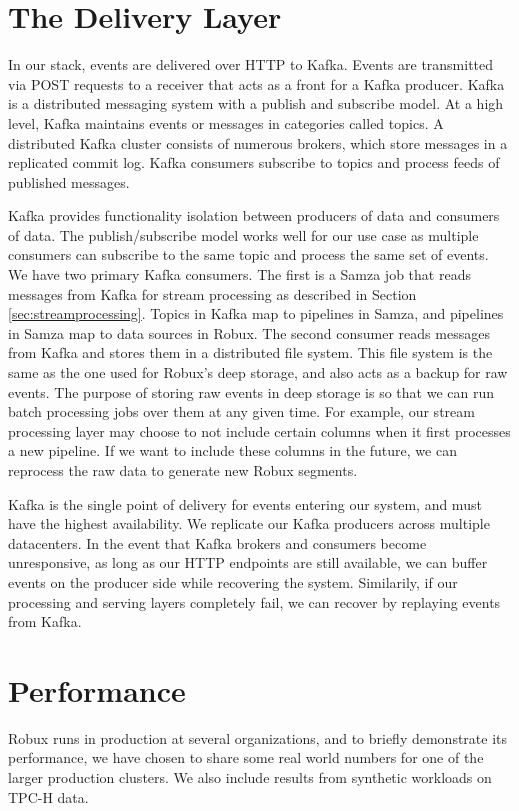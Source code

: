 \documentclass{vldb}
\begin{document}
\section{The Delivery Layer}
\label{sec:delivery}
In our stack, events are delivered over HTTP to Kafka. Events are transmitted
via POST requests to a receiver that acts as a front for a Kafka producer.
Kafka is a distributed messaging system with a publish and subscribe model. At
a high level, Kafka maintains events or messages in categories called topics. A
distributed Kafka cluster consists of numerous brokers, which store messages in
a replicated commit log. Kafka consumers subscribe to topics and process feeds
of published messages. 

Kafka provides functionality isolation between producers of data and consumers
of data. The publish/subscribe model works well for our use case as multiple
consumers can subscribe to the same topic and process the same set of events.
We have two primary Kafka consumers. The first is a Samza job that reads
messages from Kafka for stream processing as described in Section
\ref{sec:streamprocessing}. Topics in Kafka map to pipelines in Samza, and
pipelines in Samza map to data sources in Robux. The second consumer reads
messages from Kafka and stores them in a distributed file system.  This file
system is the same as the one used for Robux’s deep storage, and also acts as a
backup for raw events. The purpose of storing raw events in deep storage is so
that we can run batch processing jobs over them at any given time. For example,
our stream processing layer may choose to not include certain columns when it
first processes a new pipeline. If we want to include these columns in the
future, we can reprocess the raw data to generate new Robux segments. 

Kafka is the single point of delivery for events entering our system, and must
have the highest availability. We replicate our Kafka producers across multiple
datacenters. In the event that Kafka brokers and consumers become unresponsive,
as long as our HTTP endpoints are still available, we can buffer events on the
producer side while recovering the system. Similarily, if our processing and
serving layers completely fail, we can recover by replaying events from Kafka.

\section{Performance}
\label{sec:performance}
Robux runs in production at several organizations, and to briefly demonstrate
its performance, we have chosen to share some real world numbers for one of the larger
production clusters. We also include results from synthetic workloads on TPC-H data.
\end{document}
